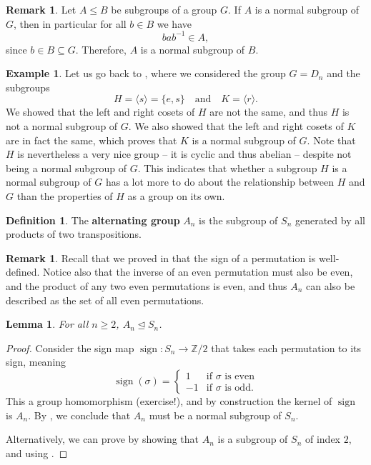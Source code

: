 \documentclass[12pt]{report}
\newtheorem{lemma}[theorem]{Lemma}
\numberwithin{equation}{section}
\numberwithin{theorem}{chapter}
\theoremstyle{definition}
\newtheorem{definition}[theorem]{Definition}
\newtheorem{example}[theorem]{Example}
\newtheorem*{basic properties}{Basic Properties}
\newtheorem*{Important Remark}{Important Remark}
\newtheorem{remark}[theorem]{Remark}
\newcommand{\df}[1]{{\bf #1}\index{#1}}
\DeclareMathOperator{\sign}{sign}
\newcommand{\Z}{\mathbb{Z}}
\def\norm{\mathrel{\unlhd}}
\begin{document}
\begin{remark}\label{normal subgroup is also normal in smaller group}
	Let $A \leq B$ be subgroups of a group $G$. If $A$ is a normal subgroup of $G$, then in particular for all $b \in B$ we have
	$$bab^{-1} \in A,$$
	since $b \in B \subseteq G$. Therefore, $A$ is a normal subgroup of $B$.
\end{remark}

\begin{example}\label{normal subgroups of D_n}
	Let us go back to , where we considered the group $G =D_{n}$ and the subgroups 
	$$H = \langle s \rangle = \{e,s\} \quad \textrm{and} \quad K = \langle r \rangle.$$
	We showed that the left and right cosets of $H$ are not the same, and thus $H$ is not a normal subgroup of $G$. We also showed that the left and right cosets of $K$ are in fact the same, which proves that $K$ is a normal subgroup of $G$. Note that $H$ is nevertheless a very nice group -- it is cyclic and thus abelian -- despite not being a normal subgroup of $G$. This indicates that whether a subgroup $H$ is a normal subgroup of $G$ has a lot more to do about the relationship between $H$ and $G$ than the properties of $H$ as a group on its own.
\end{example}


\begin{definition}
The \df{alternating group} $A_n$ is the subgroup of $S_n$ generated by all products of two transpositions.
\end{definition}


\begin{remark}
Recall that we proved in  that the sign of a permutation is well-defined. Notice also that the inverse of an even permutation must also be even, and the product of any two even permutations is even, and thus $A_n$ can also be described as the set of all even permutations.
\end{remark}


\begin{lemma}\label{A_n is normal}
	For all $n \geqslant 2$, $A_n\norm S_n$.
\end{lemma}


\begin{proof}
Consider the sign map $\sign\!\!: S_n \to \Z/2$ that takes each permutation to its sign, meaning
$$\sign(\sigma) = \begin{cases}
	1 & \textrm{if $\sigma$ is even} \\
	-1 & \textrm{if $\sigma$ is odd}.
\end{cases}$$
This a group homomorphism (exercise!), and by construction the kernel of $\sign$ is $A_n$. By , we conclude that $A_n$ must be a normal subgroup of $S_n$.

Alternatively, we can prove  by showing that $A_n$ is a subgroup of $S_n$ of index $2$, and using .
\end{proof}
\end{document}
